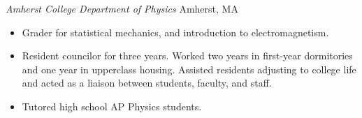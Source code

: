 \documentclass{res}
\begin{document}
\begin{resume}
{\it Amherst College Department of Physics} \hfill Amherst, MA
\begin{itemize}  \itemsep -2pt
  \item Grader for statistical mechanics, and introduction to electromagnetism.
  \item Resident councilor for three years. Worked two years in first-year dormitories and one year in upperclass housing. Assisted residents adjusting to college life and acted as a liaison between students, faculty, and staff.
  \item Tutored high school AP Physics students.
\end{itemize}

 
\end{resume} 
\end{document}
